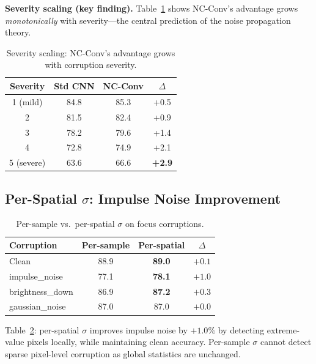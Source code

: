 \documentclass[runningheads]{llncs}
\begin{document}
\noindent\textbf{Severity scaling (key finding).}
Table~\ref{tab:severity} shows NC-Conv's advantage grows \emph{monotonically} with severity---the central prediction of the noise propagation theory.

\begin{table}[t]
\centering
\caption{Severity scaling: NC-Conv's advantage grows with corruption severity.}
\label{tab:severity}
\small
\begin{tabular}{@{}cccc@{}}
\toprule
\textbf{Severity} & \textbf{Std CNN} & \textbf{NC-Conv} & $\Delta$ \\
\midrule
1 (mild)   & 84.8 & 85.3 & +0.5 \\
2          & 81.5 & 82.4 & +0.9 \\
3          & 78.2 & 79.6 & +1.4 \\
4          & 72.8 & 74.9 & +2.1 \\
5 (severe) & 63.6 & 66.6 & \textbf{+2.9} \\
\bottomrule
\end{tabular}
\end{table}


\subsection{Per-Spatial $\sigma$: Impulse Noise Improvement}
\label{sec:perspatial_exp}

\begin{table}[t]
\centering
\caption{Per-sample vs.\ per-spatial $\sigma$ on focus corruptions.}
\label{tab:perspatial}
\small
\begin{tabular}{@{}lccc@{}}
\toprule
\textbf{Corruption} & \textbf{Per-sample} & \textbf{Per-spatial} & $\Delta$ \\
\midrule
Clean              & 88.9 & \textbf{89.0} & $+0.1$ \\
impulse\_noise     & 77.1 & \textbf{78.1} & $+1.0$ \\
brightness\_down   & 86.9 & \textbf{87.2} & $+0.3$ \\
gaussian\_noise    & 87.0 & 87.0 & $+0.0$ \\
\bottomrule
\end{tabular}
\end{table}

Table~\ref{tab:perspatial}: per-spatial $\sigma$ improves impulse noise by $+1.0\%$ by detecting extreme-value pixels locally, while maintaining clean accuracy. Per-sample $\sigma$ cannot detect sparse pixel-level corruption as global statistics are unchanged.
\end{document}
